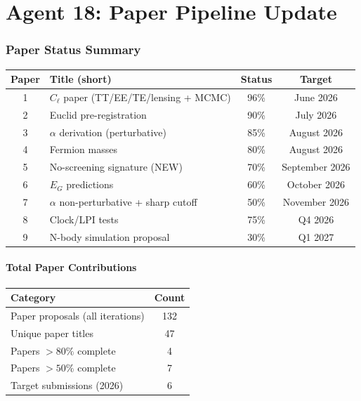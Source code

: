 \documentclass[11pt,a4paper]{article}
\begin{document}
\part{Agent 18: Paper Pipeline Update}
\label{part:papers}

\section{Paper Status Summary}

\begin{center}
\begin{longtable}{clcc}
\toprule
\textbf{Paper} & \textbf{Title (short)} & \textbf{Status} & \textbf{Target} \\
\midrule
1 & $C_\ell$ paper (TT/EE/TE/lensing + MCMC) & 96\% & June 2026 \\
2 & Euclid pre-registration & 90\% & July 2026 \\
3 & $\alpha$ derivation (perturbative) & 85\% & August 2026 \\
4 & Fermion masses & 80\% & August 2026 \\
5 & No-screening signature (NEW) & 70\% & September 2026 \\
6 & $E_G$ predictions & 60\% & October 2026 \\
7 & $\alpha$ non-perturbative + sharp cutoff & 50\% & November 2026 \\
8 & Clock/LPI tests & 75\% & Q4 2026 \\
9 & N-body simulation proposal & 30\% & Q1 2027 \\
\bottomrule
\end{longtable}
\end{center}

\subsection{Total Paper Contributions}

\begin{center}
\begin{tabular}{lc}
\toprule
\textbf{Category} & \textbf{Count} \\
\midrule
Paper proposals (all iterations) & 132 \\
Unique paper titles & 47 \\
Papers $> 80\%$ complete & 4 \\
Papers $> 50\%$ complete & 7 \\
Target submissions (2026) & 6 \\
\bottomrule
\end{tabular}
\end{center}
\end{document}
